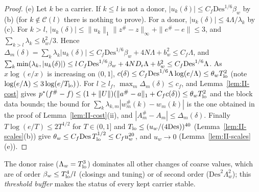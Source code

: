 \documentclass[10pt]{amsart}
\theoremstyle{definition}
\theoremstyle{remark}
\begin{document}
\begin{proof}
(e) Let $k$ be a carrier.  If $k\le l$ is not a donor, $|u_k(\delta)|\le
C_f\mathrm{Des}^{1/6}\beta_w$ by (b) (for $k\notin\mathcal C(l)$ there is
nothing to prove).  For a donor, $|u_k(\delta)|\le4\Lambda/\lambda_k$ by (c).
For $k>l$, $|u_k(\delta)|\le\|u_k\|_1\|z^\#-z\|_\infty+\|e^\#-e\|\le3$, and
$\sum_{k>l}\lambda_k\le b_w^2/3$.  Hence $\Delta_m(\delta)=\sum_k\lambda_k
|u_k(\delta)|\le C_f\mathrm{Des}^{1/6}\beta_w+4N\Lambda+b_w^2\le C_f\Lambda$,
and $\sum_k\min(\lambda_k,|u_k(\delta)|)\le l\,C_f\mathrm{Des}^{1/6}\beta_w+
4ND_{\rm r}\Lambda+b_w^2\le C_f\mathrm{Des}^{1/6}\Lambda$.  As $x\log(e/x)$ is
increasing on $(0,1]$, $c(\delta)\le C_f\mathrm{Des}^{1/6}\Lambda\log(e/
\Lambda)\le\theta_wT_{\rm lo}^2$ (note $\log(e/\Lambda)\le3\log(e/
T_{\rm lo})$).  For $l\ge l_f$, $\max_m\Delta_m(\delta)\le c_f$, and
Lemma~\ref{lem:II-cost} gives $p^*(f^\#-f)\le(1+\|U\|)(\|a^\#-a\|_1+C_f
c(\delta))\le\theta_wT_{\rm lo}^2$ and the block data bounds; the bound for
$\sum_k\lambda_{k,m}|w^\#_m(k)-w_m(k)|$ is the one obtained in the proof of
Lemma~\ref{lem:II-cost}(ii), and $|A^\#_m-A_m|\le\Delta_m(\delta)$.
Finally $T\log(e/T)\le2T^{1/2}$ for $T\in(0,1]$ and $T_{\rm lo}\le
(u_w/(4\mathrm{Des}))^{40}$ (Lemma~\ref{lem:II-scales}(b)) give $\theta_w\le
C_f\mathrm{Des}\,T_{\rm lo}^{1/2}\le C_fu_w^{20}$, and $u_w\to0$
(Lemma~\ref{lem:II-scales}(e)).
\end{proof}

The donor raise ($\Lambda_w=T_{\rm lo}^3$) dominates all other changes of
coarse values, which are of order $\beta_w\le T_{\rm lo}^4/l$ (closings and
tuning) or of second order ($\mathrm{Des}^2\Lambda_w^2$); this
\emph{threshold buffer} makes the status of every kept carrier stable.
\end{document}
